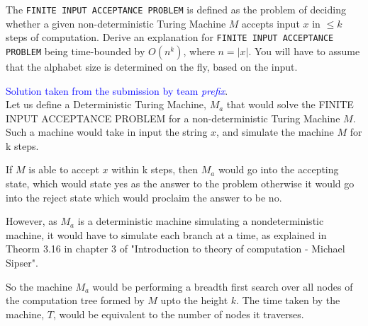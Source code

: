 \documentclass[a4page]{exam}
\begin{document}
\begin{questions}
\begin{solution}
\begin{center}
    \end{center}

  \end{solution}

\question[20] The \texttt{FINITE INPUT ACCEPTANCE PROBLEM} is defined as the problem of deciding whether a given non-deterministic Turing Machine $M$ accepts input $x$ in $\leq k$ steps of computation. Derive an explanation for \texttt{FINITE INPUT ACCEPTANCE PROBLEM} being time-bounded by $O(n^k)$, where $n=|x|$. You will have to assume that the alphabet size is determined on the fly, based on the input.
  \begin{solution}
    \textcolor{blue}{Solution taken from the submission by team \textit{prefix}}.\\
     Let us define a Deterministic Turing Machine, $M_a$ that would solve the FINITE INPUT ACCEPTANCE PROBLEM
     for a non-deterministic Turing Machine $M$.
     Such a machine would take in input the string $x$, and simulate the machine $M$ for k steps. 
     
     If $M$ is able to accept $x$
     within k steps, then $M_a$ would go into the accepting state, which would state yes as the answer to the problem otherwise 
     it would go into the reject state which would proclaim the answer to be no.
     
     However, as $M_a$ is a deterministic machine simulating a nondeterministic machine, it would have to simulate
     each branch at a time, as explained in Theorm 3.16 in chapter 3 of "Introduction to theory of computation - Michael Sipser".
     
     So the machine $M_a$ would be performing a breadth first search over all nodes of the computation tree formed by $M$  
     upto the height $k$. The time taken by the machine, $T$, would be equivalent to the number of nodes it traverses.



\end{solution}
\end{questions}
\end{document}

